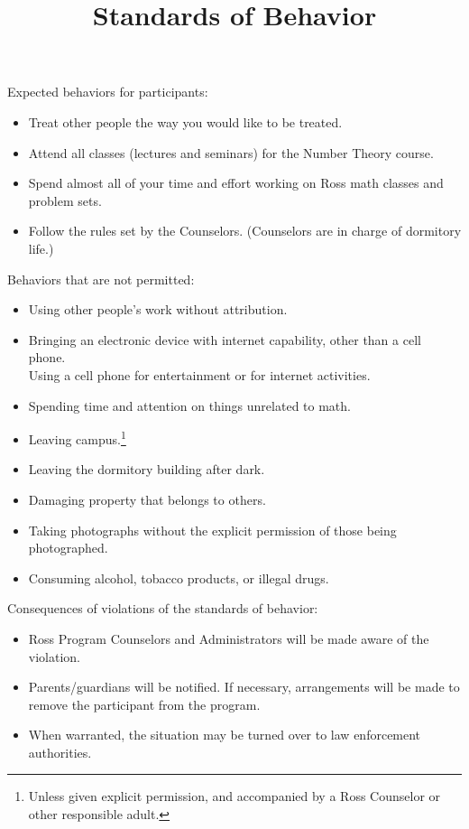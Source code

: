\documentclass{rossasia}
\title{Standards of Behavior}
\makeatletter
\newcommand\footnoteref[1]{\protected@xdef\@thefnmark{\ref{#1}}\@footnotemark}
\makeatother
\begin{document}
\maketitle
Expected behaviors for participants:
\begin{itemize}
\item Treat other people the way you would like to be treated.
\item Attend all classes (lectures and seminars) for the Number Theory course.
\item Spend almost all of your time and effort working on Ross math classes and \\
problem sets.
\item Follow the rules set by the Counselors. (Counselors are in charge of dormitory life.)
\end{itemize}

Behaviors that are not permitted:
\begin{itemize}
\item Using other people's work without attribution.
\item Bringing an electronic device with internet capability, other than a cell phone.\\
Using a cell phone for entertainment or for internet activities.
\item Spending time and attention on things unrelated to math.
\item Leaving campus.\footnote{\label{counselors}Unless given explicit permission, 
and accompanied by a Ross Counselor or other responsible adult.}
\item Leaving the dormitory building after dark.\footnoteref{counselors}
\item Damaging property that belongs to others.
\item Taking photographs without the explicit permission of those being photographed.
\item Consuming alcohol, tobacco products, or illegal drugs.
\end{itemize}

Consequences of violations of the standards of behavior:
\begin{itemize}
\item Ross Program Counselors and Administrators will be made aware of
  the violation.
\item Parents/guardians will be notified. If necessary, arrangements
  will be made to remove the participant from the program.
\item When warranted, the situation may be turned over to law
  enforcement authorities.
\end{itemize}
\end{document}
